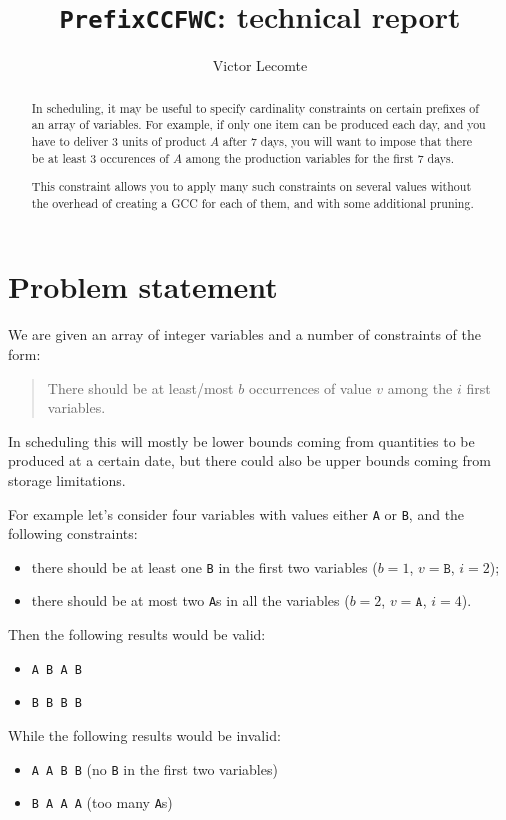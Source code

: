 \documentclass[a4paper,10pt]{article}
\begin{document}
\title{\texttt{PrefixCCFWC}: technical report}
\author{Victor Lecomte}
\maketitle

\begin{abstract}
In scheduling, it may be useful to specify cardinality constraints on certain prefixes of an array of variables. For example, if only one item can be produced each day, and you have to deliver 3 units of product $A$ after 7 days, you will want to impose that there be at least 3 occurences of $A$ among the production variables for the first 7 days.

This constraint allows you to apply many such constraints on several values without the overhead of creating a GCC for each of them, and with some additional pruning.
\end{abstract}

\tableofcontents

\section{Problem statement}
We are given an array of integer variables and a number of constraints of the form:
\begin{quote}
There should be at least/most $b$ occurrences of value $v$ among the $i$ first variables.
\end{quote}
In scheduling this will mostly be lower bounds coming from quantities to be produced at a certain date, but there could also be upper bounds coming from storage limitations.

For example let's consider four variables with values either \texttt{A} or \texttt{B}, and the following constraints:
\begin{itemize}
    \item there should be at least one \texttt{B} in the first two variables ($b=1$, $v=\texttt{B}$, $i=2$);
    \item there should be at most two \texttt{A}s in all the variables ($b=2$, $v=\texttt{A}$, $i=4$).
\end{itemize}
Then the following results would be valid:
\begin{itemize}
    \item \texttt{A B A B}
    \item \texttt{B B B B}
\end{itemize}
While the following results would be invalid:
\begin{itemize}
    \item \texttt{A A B B} (no \texttt{B} in the first two variables)
    \item \texttt{B A A A} (too many \texttt{A}s)
\end{itemize}
\end{document}

